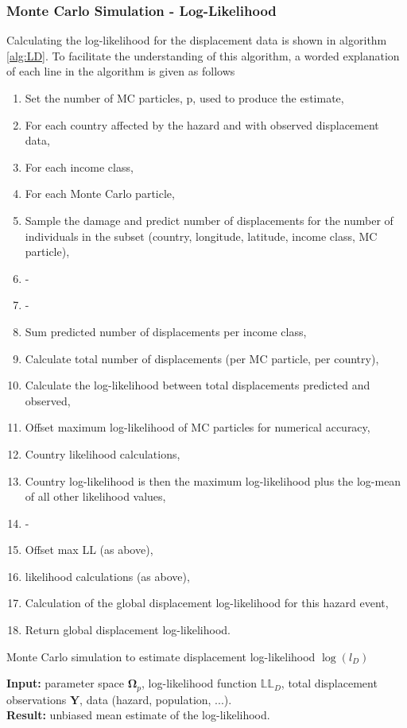 \documentclass[10pt,a4paper]{article}
\begin{document}
\begin{multicols}{1}
\subsubsection{Monte Carlo Simulation - Log-Likelihood}\label{sec:MC}
Calculating the log-likelihood for the displacement data is shown in algorithm \ref{alg:LD}. To facilitate the understanding of this algorithm, a worded explanation of each line in the algorithm is given as follows
\begin{enumerate}
\item Set the number of MC particles, p, used to produce the estimate,
\item For each country affected by the hazard and with observed displacement data,
\item For each income class,
\item For each Monte Carlo particle,
\item Sample the damage and predict number of displacements for the number of individuals in the subset (country, longitude, latitude, income class, MC particle),
\item -
\item -
\item Sum predicted number of displacements per income class,
\item Calculate total number of displacements (per MC particle, per country),
\item Calculate the log-likelihood between total displacements predicted and observed,
\item Offset maximum log-likelihood of MC particles for numerical accuracy,
\item Country likelihood calculations,
\item Country log-likelihood is then the maximum log-likelihood plus the log-mean of all other likelihood values,
\item -
\item Offset max LL (as above),
\item likelihood calculations (as above),
\item Calculation of the global displacement log-likelihood for this hazard event,
\item Return global displacement log-likelihood.
\end{enumerate}  
\begin{algorithm}[H]
\caption{\label{alg:LD} Monte Carlo simulation to estimate displacement log-likelihood $\log(l_D)$}
    \hspace*{\algorithmicindent} \textbf{Input:} parameter space $\boldsymbol{\Omega}_p$, log-likelihood function $\mathbb{LL}_D$, total displacement observations $\boldsymbol{Y}$, data (hazard, population, ...).  \\
    \hspace*{\algorithmicindent} \textbf{Result:} unbiased mean estimate of the log-likelihood.
    

\end{algorithm}
\end{multicols}
\end{document}
